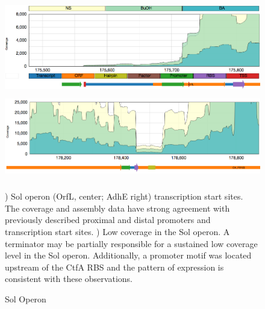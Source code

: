 \begin{figure}
\small
{\includegraphics[width=\textwidth,height=1.5in]{images/Assembly/Examples/Sol/Sol-TSS.png}
\label{fig:3a}}
{\includegraphics[width=\textwidth,height=1.5in]{images/Assembly/Examples/Sol/AdhE-terminator.png}
\label{fig:3b}}
\caption{Sol Operon}
) Sol operon (OrfL, center; AdhE right) transcription start sites. The coverage and assembly data have strong agreement with previously described proximal and distal promoters and transcription start sites. ) Low coverage in the Sol operon. A terminator may be partially responsible for a sustained low coverage level in the Sol operon. Additionally, a promoter motif was located upstream of the CtfA RBS and the pattern of expression is consistent with these observations.
\end{figure}

